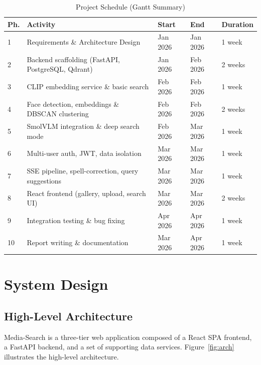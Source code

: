 \documentclass[12pt,a4paper,oneside]{report}
\begin{document}
\begin{table}[H]
\centering\small
\caption{Project Schedule (Gantt Summary)}
\label{tab:gantt}
\renewcommand{\arraystretch}{1.4}
\begin{tabular}{|p{0.7cm}|p{6.3cm}|p{1.8cm}|p{1.8cm}|p{1.7cm}|}
\hline
\textbf{Ph.} & \textbf{Activity} & \textbf{Start} & \textbf{End} & \textbf{Duration} \\
\hline
1 & Requirements \& Architecture Design & Jan 2026 & Jan 2026 & 1 week \\
\hline
2 & Backend scaffolding (FastAPI, PostgreSQL, Qdrant) & Jan 2026 & Feb 2026 & 2 weeks \\
\hline
3 & CLIP embedding service \& basic search & Feb 2026 & Feb 2026 & 1 week \\
\hline
4 & Face detection, embeddings \& DBSCAN clustering & Feb 2026 & Feb 2026 & 2 weeks \\
\hline
5 & SmolVLM integration \& deep search mode & Feb 2026 & Mar 2026 & 1 week \\
\hline
6 & Multi-user auth, JWT, data isolation & Mar 2026 & Mar 2026 & 1 week \\
\hline
7 & SSE pipeline, spell-correction, query suggestions & Mar 2026 & Mar 2026 & 1 week \\
\hline
8 & React frontend (gallery, upload, search UI) & Mar 2026 & Mar 2026 & 2 weeks \\
\hline
9 & Integration testing \& bug fixing & Apr 2026 & Apr 2026 & 1 week \\
\hline
10 & Report writing \& documentation & Mar 2026 & Apr 2026 & 1 week \\
\hline
\end{tabular}
\end{table}

\chapter{System Design}

\section{High-Level Architecture}
\label{sec:arch}

Media-Search is a three-tier web application composed of a React SPA
frontend, a FastAPI backend, and a set of supporting data services.
Figure~\ref{fig:arch} illustrates the high-level architecture.
\end{document}
